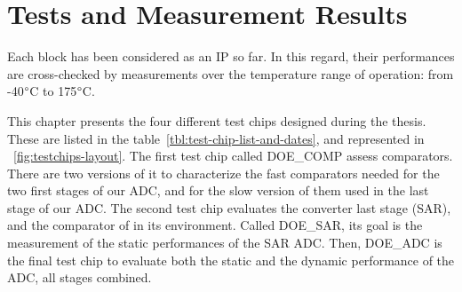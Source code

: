 \chapter{Tests and Measurement Results}
\label{sec:tests-meas}
\ifpdf
    \graphicspath{{Chapter5/Figs/Raster/}{Chapter5/Figs/PDF/}{Chapter5/Figs/}}
\else
    \graphicspath{{Chapter5/Figs/Vector/}{Chapter5/Figs/}}
\fi 

Each block has been considered as an IP so far. In this regard, their performances are cross-checked by measurements over the temperature range of operation: from -40$\degree$C to 175$\degree$C.

This chapter presents the four different test chips designed during the thesis. These are listed in the table~\ref{tbl:test-chip-list-and-dates}, and represented in \figurename~\ref{fig:testchips-layout}. The first test chip called DOE\_COMP assess comparators. There are two versions of it to characterize the fast comparators needed for the two first stages of our ADC, and for the slow version of them used in the last stage of our ADC. The second test chip evaluates the converter last stage (SAR), and the comparator of in its environment. Called DOE\_SAR, its goal is the measurement of the static performances of the SAR ADC\@. Then, DOE\_ADC is the final test chip to evaluate both the static and the dynamic performance of the ADC, all stages combined.


